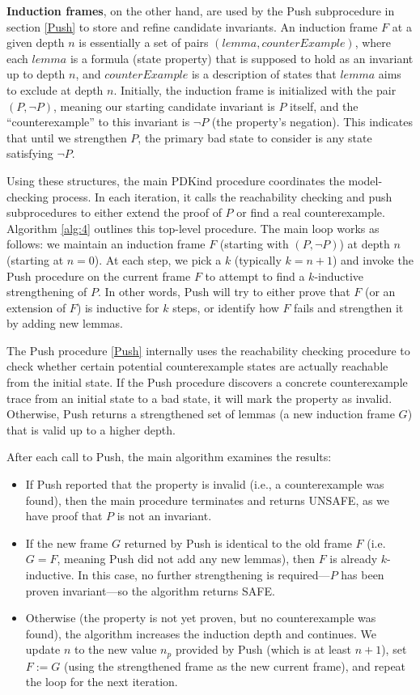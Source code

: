 \textbf{Induction frames}, on the other hand, are used by the 
Push subprocedure in section \ref{Push} to store
and refine candidate invariants. An induction frame $F$ at a given depth
$n$ is essentially a set of pairs $(\mathit{lemma}, \mathit{counterExample})$,
where each $\mathit{lemma}$ is a formula (state property) that is supposed to
hold as an invariant up to depth $n$, and $\mathit{counterExample}$ is a
description of states that $\mathit{lemma}$ aims to exclude at depth $n$.
Initially, the induction frame is initialized with the pair $(P, \neg P)$, meaning
our starting candidate invariant is $P$ itself, and the “counterexample” to
this invariant is $\neg P$ (the property’s negation). This indicates that until
we strengthen $P$, the primary bad state to consider is any state satisfying
$\neg P$.

Using these structures, the main PDKind procedure coordinates the
model-checking process. In each iteration, it calls the reachability checking and push
subprocedures to either extend the proof of $P$ or find a real counterexample.
Algorithm \ref{alg:4} outlines this top-level procedure. The main loop works as
follows: we maintain an induction frame $F$ (starting with $(P, \neg P)$) at
depth $n$ (starting at $n=0$). At each step, we pick a $k$ (typically $k =
n+1$) and invoke the Push procedure on the current frame $F$ to attempt to find
a $k$-inductive strengthening of $P$. In other words, Push will try to
either prove that $F$ (or an extension of $F$) is inductive for $k$ steps, or
identify how $F$ fails and strengthen it by adding new lemmas.

The Push procedure \ref{Push} internally uses the reachability
checking procedure to check whether certain potential counterexample states are
actually reachable from the initial state. If the Push procedure discovers a
concrete counterexample trace from an initial state to a bad state, it will
mark the property as invalid. Otherwise, Push returns a strengthened set of
lemmas (a new induction frame $G$) that is valid up to a higher depth.

After each call to Push, the main algorithm examines the results:
\begin{itemize} 
    \item If Push reported that the property is invalid (i.e., a
counterexample was found), then the main procedure terminates and returns
\textsf{UNSAFE}, as we have proof that $P$ is not an invariant. 
    \item If the
new frame $G$ returned by Push is identical to the old frame $F$ (i.e.\ $G =
F$, meaning Push did not add any new lemmas), then $F$ is already
$k$-inductive. In this case, no further strengthening is required—$P$ has been
proven invariant—so the algorithm returns \textsf{SAFE}. 
    \item Otherwise (the
property is not yet proven, but no counterexample was found), the algorithm
increases the induction depth and continues. We update $n$ to the new value
$n_p$ provided by Push (which is at least $n+1$), set $F := G$ (using the
strengthened frame as the new current frame), and repeat the loop for the next
iteration. 
\end{itemize}

